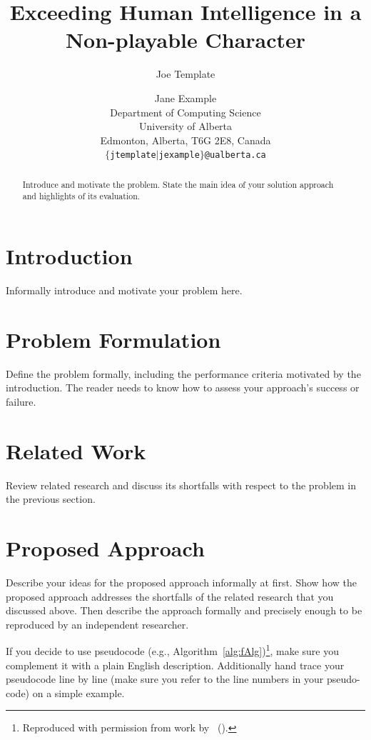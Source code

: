 \documentclass[letterpaper]{article}
\title{Exceeding Human Intelligence in a Non-playable Character}
\author{Joe Template \and Jane Example \\
Department of Computing Science \\ University of Alberta \\
Edmonton, Alberta, T6G 2E8, Canada \\
{\tt $\{$jtemplate$\mid$jexample$\}$@ualberta.ca}}
\newcommand{\citea}[1]{\citeauthor{#1} (\citeyear{#1})}
\numberwithin{equation}{section}
\numberwithin{theorem}{section}
\numberwithin{lemma}{section}
\numberwithin{df}{section}
\begin{document}
\maketitle

\begin{abstract}
Introduce and motivate the problem. State the main idea of your solution approach and highlights of its evaluation.
\end{abstract}

\section{Introduction}

Informally introduce and motivate your problem here. 

\section{Problem Formulation}

Define the problem formally, including the performance criteria motivated by the introduction. The reader needs to know how to assess your approach's success or failure.

\section{Related Work}

Review related research and discuss its shortfalls with respect to the problem in the previous section. 

\section{Proposed Approach}

Describe your ideas for the proposed approach informally at first. Show how the proposed approach addresses the shortfalls of the related research that you discussed above. Then describe the approach formally and precisely enough to be reproduced by an independent researcher.

If you decide to use pseudocode (e.g., Algorithm~\ref{alg:fAlg})\footnote{Reproduced with permission from work by~\citea{flow}.}, make sure you complement it with a plain English description. Additionally hand trace your pseudocode line by line (make sure you refer to the line numbers in your pseudo-code) on a simple example.
\end{document}
